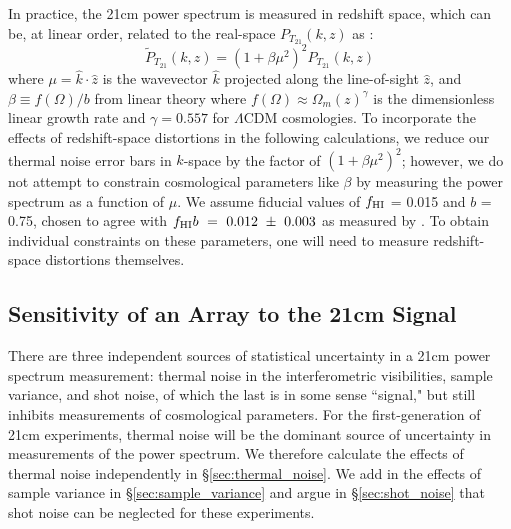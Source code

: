\documentclass[10pt,iop]{emulateapj}
\begin{document}
In practice, the 21cm power spectrum is measured in
redshift space, which can be, at linear order, related to the real-space
$P_{T_{21}}(k,z)$ as \citep{kaiser_1987}:
\begin{equation}
\tilde{P}_{T_{21}}(k,z)=(1 + \beta \mu^2)^2 P_{T_{21}}(k,z)
\end{equation}
where $\mu = \hat{k} \cdot \hat{z}$ is the wavevector $\hat{k}$
projected along the line-of-sight $\hat{z}$, and $\beta \equiv f(\Omega)/b$ from
linear theory where $f(\Omega) \approx \Omega_m(z)^{\gamma}$ is the
dimensionless linear growth rate and $\gamma=0.557$ for $\Lambda$CDM
cosmologies.  To incorporate the effects of redshift-space distortions in the following
calculations, we reduce our thermal noise error bars in $k$-space by the factor of $(1+\beta\mu^2)^2$;
however, we do not attempt to constrain cosmological parameters like $\beta$ by measuring the power
spectrum as a function of $\mu$.  
We assume fiducial values of $f_{\rm{HI}}$ =
0.015 and $b$ = 0.75, chosen to agree with $f_{\rm{HI}}b~=~0.012~\pm~0.003$ as measured by \citet{chang_et_al_2010}.  To obtain individual constraints on these parameters, one will need to measure
redshift-space distortions themselves.

\subsection{Sensitivity of an Array to the 21cm Signal}
\label{sec:sensitivity}

There are three independent sources of statistical uncertainty in a 21cm power spectrum measurement: thermal
noise in the interferometric visibilities, sample variance, and shot noise, of which the last is in some
sense ``signal," but still inhibits measurements of cosmological parameters.
For the first-generation of 21cm experiments, thermal noise will be the dominant source of
uncertainty in measurements of the power spectrum.  We therefore calculate the effects
of thermal noise independently in \S\ref{sec:thermal_noise}.  We add in the effects of sample
variance in \S\ref{sec:sample_variance} and argue in \S\ref{sec:shot_noise} that shot noise
can be neglected for these experiments.
\end{document}
